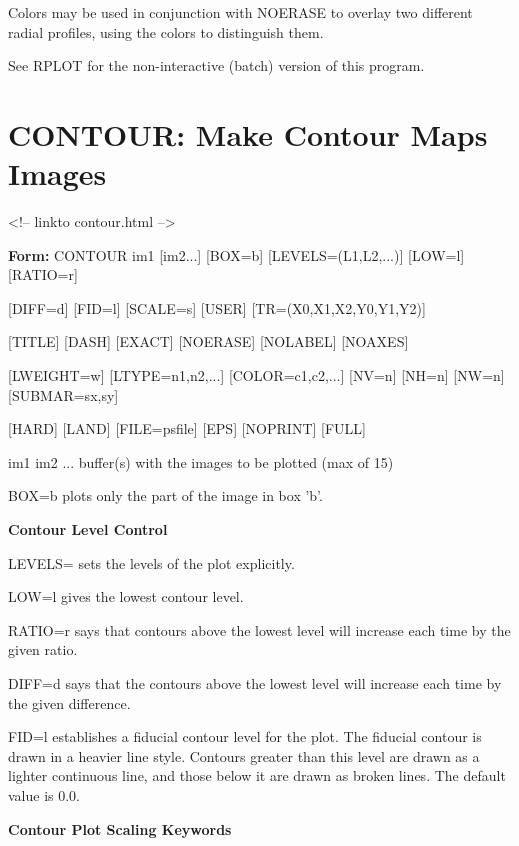 Colors may be used in conjunction with NOERASE to overlay two different
radial profiles, using the colors to distinguish them.

See RPLOT for the non-interactive (batch) version of this program.

\section{CONTOUR: Make Contour Maps Images}
\begin{rawhtml}
<!-- linkto contour.html -->
\end{rawhtml}
\begin{command} 
  \item[\textbf{Form:} CONTOUR im1 {[im2...]} {[BOX=b]} 
       {[LEVELS=(L1,L2,...)]} {[LOW=l]} {[RATIO=r]} ]{}
  \item[{[DIFF=d]} {[FID=l]} {[SCALE=s]} {[USER]} 
        {[TR=(X0,X1,X2,Y0,Y1,Y2)]} ]{}
  \item[{[TITLE]} {[DASH]} {[EXACT]} {[NOERASE]} {[NOLABEL]} {[NOAXES]}]{}
  \item[{[LWEIGHT=w]} {[LTYPE=n1,n2,...]} {[COLOR=c1,c2,...]} {[NV=n]} 
        {[NH=n]} {[NW=n]} {[SUBMAR=sx,sy]}]{}
  \item[{[HARD]} {[LAND]} {[FILE=psfile]} {[EPS]} {[NOPRINT]} {[FULL]} ]{}
  \item[im1 im2 ...]{buffer(s) with the images to be plotted (max of 15)}
  \item[BOX=b]{plots only the part of the image in box 'b'.}
  \item[\textbf{Contour Level Control}\hfill]{}
  \item[LEVELS=]{sets the levels of the plot explicitly.}
  \item[LOW=l]{gives the lowest contour level.}
  \item[RATIO=r]{says that contours above the lowest level will increase
       each time by the given ratio.}
  \item[DIFF=d]{says that the contours above the lowest level will
       increase each time by the given difference.}
  \item[FID=l]{establishes a fiducial contour level for the plot.  The
       fiducial contour is drawn in a heavier line style.
       Contours greater than this level are drawn as a lighter
       continuous line, and those below it are drawn as broken
       lines.  The default value is 0.0.}
  \item[\textbf{Contour Plot Scaling Keywords}\hfill]{}

\end{command}

